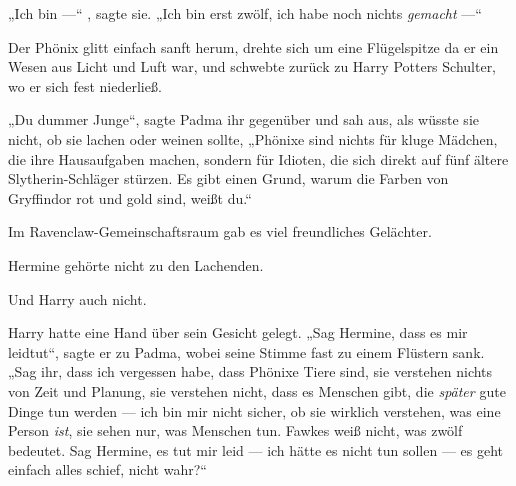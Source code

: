 „Ich bin —“ , sagte sie.
„Ich bin erst zwölf, ich habe noch nichts \emph{gemacht} —“

Der Phönix glitt einfach sanft herum, drehte sich um eine Flügelspitze da er ein Wesen aus Licht und Luft war, und schwebte zurück zu Harry Potters Schulter, wo er sich fest niederließ.

„Du dummer Junge“, sagte Padma ihr gegenüber und sah aus, als wüsste sie nicht, ob sie lachen oder weinen sollte,
„Phönixe sind nichts für kluge Mädchen, die ihre Hausaufgaben machen, sondern für Idioten, die sich direkt auf fünf ältere Slytherin-Schläger stürzen. Es gibt einen Grund, warum die Farben von Gryffindor rot und gold sind, weißt du.“

Im Ravenclaw-Gemeinschaftsraum gab es viel freundliches Gelächter.

Hermine gehörte nicht zu den Lachenden.

Und Harry auch nicht.

Harry hatte eine Hand über sein Gesicht gelegt.
„Sag Hermine, dass es mir leidtut“, sagte er zu Padma, wobei seine Stimme fast zu einem Flüstern sank.
„Sag ihr, dass ich vergessen habe, dass Phönixe Tiere sind, sie verstehen nichts von Zeit und Planung, sie verstehen nicht, dass es Menschen gibt, die \emph{später} gute Dinge tun werden — ich bin mir nicht sicher, ob sie wirklich verstehen, was eine Person \emph{ist}, sie sehen nur, was Menschen tun. Fawkes weiß nicht, was zwölf bedeutet. Sag Hermine, es tut mir leid — ich hätte es nicht tun sollen — es geht einfach alles schief, nicht wahr?“


